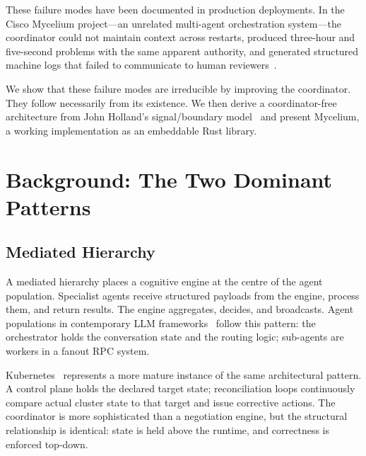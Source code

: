 \documentclass[11pt]{article}
\begin{document}
These failure modes have been documented in production deployments. In the
Cisco Mycelium project---an unrelated multi-agent orchestration system---the
coordinator could not maintain context across restarts, produced three-hour
and five-second problems with the same apparent authority, and generated
structured machine logs that failed to communicate to human
reviewers~\cite{signal-noise,context-problem}.

We show that these failure modes are irreducible by improving the coordinator.
They follow necessarily from its existence. We then derive a coordinator-free
architecture from John Holland's signal/boundary model~\cite{holland} and present
Mycelium, a working implementation as an embeddable Rust library.

\section{Background: The Two Dominant Patterns}

\subsection{Mediated Hierarchy}

A mediated hierarchy places a cognitive engine at the centre of the agent
population. Specialist agents receive structured payloads from the engine, process
them, and return results. The engine aggregates, decides, and broadcasts. Agent
populations in contemporary LLM frameworks~\cite{mas-survey} follow this pattern:
the orchestrator holds the conversation state and the routing logic; sub-agents
are workers in a fanout RPC system.

Kubernetes~\cite{kubernetes} represents a more mature instance of the same
architectural pattern. A control plane holds the declared target state;
reconciliation loops continuously compare actual cluster state to that target and
issue corrective actions. The coordinator is more sophisticated than a negotiation
engine, but the structural relationship is identical: state is held above the
runtime, and correctness is enforced top-down.
\end{document}
